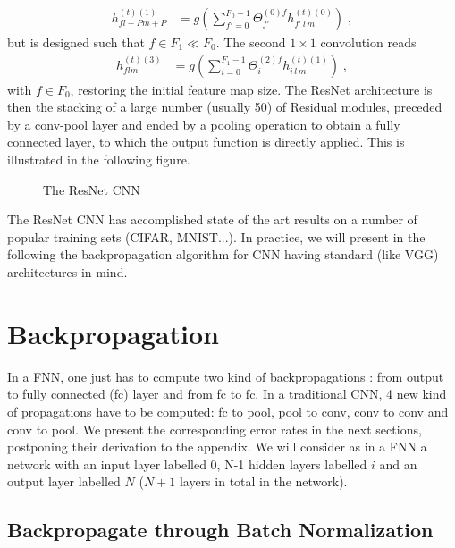 \begin{align}
h^{(t)(1)}_{fl+Pm+P}&=
%
g\left(\sum^{F_0-1}_{f'=0}
%
\Theta^{(0)f}_{f'}h^{(t)(0)}_{f'\,l\,m}\right)\;,
\end{align}
but is designed such that $f\in F_1\ll F_0$. The second $1\times 1$ convolution reads
\begin{align}
h^{(t)(3)}_{flm}&=g\left(\sum^{F_1-1}_{i=0}\Theta^{(2)f}_{i}h^{(t)(1)}_{i\,l\,m}\right)\;,
\end{align}
with $f \in F_0$, restoring the initial feature map size. The ResNet architecture is then the stacking of a large number (usually 50) of Residual modules, preceded by a conv-pool layer and ended by a pooling operation to obtain a fully connected layer, to which the output function is directly applied. This is illustrated in the following figure.



\begin{figure}[H]
\begin{center}
\caption{The ResNet CNN}
\end{center}
\end{figure}


The ResNet CNN has accomplished state of the art results on a number of popular training sets (CIFAR, MNIST...). In practice, we will present in the following the backpropagation algorithm for CNN having standard (like VGG) architectures in mind.

\section{Backpropagation}

In a FNN, one just has to compute two kind of backpropagations : from output to fully connected (fc) layer and from fc to fc. In a traditional CNN, 4 new kind of propagations have to be computed: fc to pool, pool to conv, conv to conv and conv to pool. We present the corresponding error rates in the next sections, postponing their derivation to the appendix. We will consider as in a FNN a network with an input layer labelled $0$, N-1 hidden layers labelled $i$ and an output layer labelled $N$ ($N+1$ layers in total in the network).


\subsection{Backpropagate through Batch Normalization} \label{sec:BackpropbatchnormCNN}

